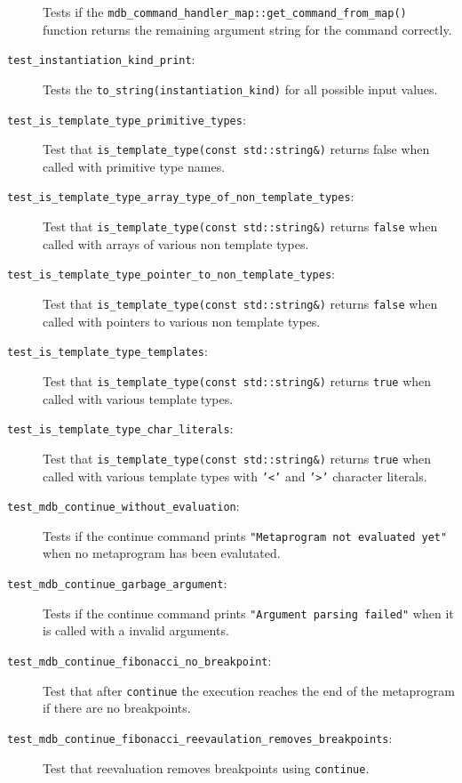 \begin{description}
        Tests if the
        \texttt{mdb\_command\_handler\_map::get\_command\_from\_map()}
        function returns the remaining argument string for the command
        correctly.
    \item[\texttt{test\_instantiation\_kind\_print}:]
        Tests the \texttt{to\_string(instantiation\_kind)} for all possible
        input values.
    \item[\texttt{test\_is\_template\_type\_primitive\_types}:]
        Test that \texttt{is\_template\_type(const std::string\&)} returns
        false when called with primitive type names.
    \item[\texttt{test\_is\_template\_type\_array\_type\_of\_non\_template\_types}:]
        Test that \texttt{is\_template\_type(const std::string\&)} returns
        \texttt{false} when called with arrays of various non template types.
    \item[\texttt{test\_is\_template\_type\_pointer\_to\_non\_template\_types}:]
        Test that \texttt{is\_template\_type(const std::string\&)} returns
        \texttt{false} when called with pointers to various non template types.
    \item[\texttt{test\_is\_template\_type\_templates}:]
        Test that \texttt{is\_template\_type(const std::string\&)} returns
        \texttt{true} when called with various template types.
    \item[\texttt{test\_is\_template\_type\_char\_literals}:]
        Test that \texttt{is\_template\_type(const std::string\&)} returns
        \texttt{true} when called with various template types with
        \texttt{'<'} and \texttt{'>'} character literals.
    \item[\texttt{test\_mdb\_continue\_without\_evaluation}:]
        Tests if the continue command prints
        \texttt{"Metaprogram not evaluated yet"} when no metaprogram has been
        evalutated.
    \item[\texttt{test\_mdb\_continue\_garbage\_argument}:]
        Tests if the continue command prints
        \texttt{"Argument parsing failed"} when it is called with a invalid
        arguments.
    \item[\texttt{test\_mdb\_continue\_fibonacci\_no\_breakpoint}:]
        Test that after \texttt{continue} the execution reaches the end of the
        metaprogram if there are no breakpoints.
    \item[\texttt{test\_mdb\_continue\_fibonacci\_reevaulation\_removes\_breakpoints}:]
        Test that reevaluation removes breakpoints using \texttt{continue}.

\end{description}
